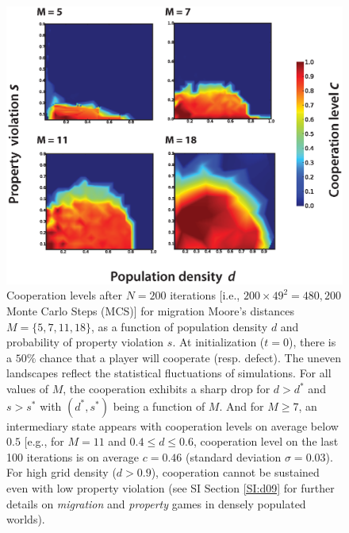 \begin{figure}[h]
\begin{center}
\centerline{\includegraphics[width=14cm]{../figures/heatmaps.eps}}
\caption{Cooperation levels after $N=200$ iterations [i.e., $200 \times 49^2 = 480,200$ Monte Carlo Steps (MCS)] for migration Moore's distances $M = \{5,7,11,18 \}$, as a function of population density $d$ and probability of property violation $s$. At initialization ($t=0$), there is a $50\%$ chance that a player will cooperate (resp. defect). The uneven landscapes reflect the statistical fluctuations of simulations. For all values of $M$, the cooperation exhibits a sharp drop for $d > d^*$  and $s > s^*$ with $(d^*,s^*)$ being a function of $M$. And for $M \geqslant 7$, an intermediary state appears with cooperation levels on average below $0.5$ [e.g., for $M=11$ and $0.4 \leqslant d \leqslant  0.6$, cooperation level on the last 100 iterations is on average $c = 0.46$ (standard deviation $\sigma = 0.03$). For high grid density ($d > 0.9$), cooperation cannot be sustained even with low property violation (see SI Section \ref{SI:d09} for further details on {\it migration} and {\it property} games in densely populated worlds).}
\label{fig:heatmaps}
\end{center}
\end{figure}






